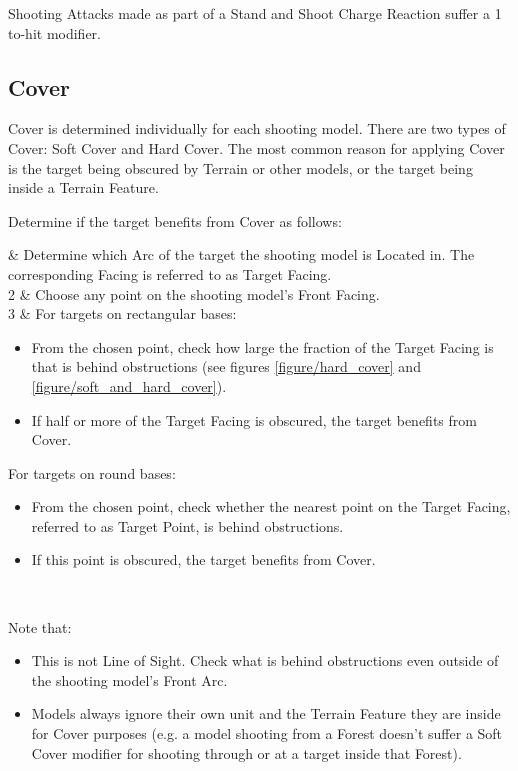 Shooting Attacks made as part of a Stand and Shoot Charge Reaction suffer a \minuss{}1 to-hit modifier.

\columnbreak

\subsection{Cover}
\label{cover}\label{target_facing}

Cover is determined individually for each shooting model. There are two types of Cover: Soft Cover and Hard Cover. The most common reason for applying Cover is the target being obscured by Terrain or other models, or the target being inside a Terrain Feature.

Determine if the target benefits from Cover as follows:

 & Determine which Arc of the target the shooting model is Located in. The corresponding Facing is referred to as Target Facing.\\
	2 & Choose any point on the shooting model's Front Facing.\\
	3 & For targets on rectangular bases:
			\begin{itemize}
			\item From the chosen point, check how large the fraction of the Target Facing is that is behind obstructions (see figures \ref{figure/hard_cover} and \ref{figure/soft_and_hard_cover}).
			\item If half or more of the Target Facing is obscured, the target benefits from Cover.
			\end{itemize}
		For targets on round bases:
			\begin{itemize}
			\item From the chosen point, check whether the nearest point on the Target Facing, referred to as Target Point, is behind obstructions.
			\item If this point is obscured, the target benefits from Cover.
			\end{itemize}\vspace*{-12pt}\strut
		\\
\closeseqtablemc

Note that:
\begin{itemize}
\item This is not Line of Sight. Check what is behind obstructions even outside of the shooting model's Front Arc.

\item Models always ignore their own unit and the Terrain Feature they are inside for Cover purposes (e.g. a model shooting from a Forest doesn't suffer a Soft Cover modifier for shooting through or at a target inside that Forest).
\end{itemize}


